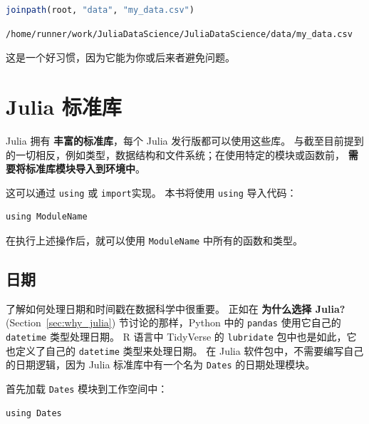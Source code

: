 \documentclass[
  notoc %
]{tufte-book}
\newcommand{\passthrough}[1]{#1}
\begin{document}
\begin{lstlisting}[language=Julia]
joinpath(root, "data", "my_data.csv")
\end{lstlisting}

\begin{lstlisting}[language=Output]
/home/runner/work/JuliaDataScience/JuliaDataScience/data/my_data.csv
\end{lstlisting}

这是一个好习惯，因为它能为你或后来者避免问题。

\hypertarget{sec:standardlibrary}{%
\section{Julia 标准库}\label{sec:standardlibrary}}

Julia 拥有 \textbf{丰富的标准库}，每个 Julia 发行版都可以使用这些库。
与截至目前提到的一切相反，例如类型，数据结构和文件系统；在使用特定的模块或函数前，
\textbf{需要将标准库模块导入到环境中}。

这可以通过 \passthrough{\lstinline!using!} 或
\passthrough{\lstinline!import!}实现。 本书将使用
\passthrough{\lstinline!using!} 导入代码：

\begin{lstlisting}
using ModuleName
\end{lstlisting}

在执行上述操作后，就可以使用 \passthrough{\lstinline!ModuleName!}
中所有的函数和类型。

\hypertarget{sec:dates}{%
\subsection{日期}\label{sec:dates}}

了解如何处理日期和时间戳在数据科学中很重要。 正如在 \textbf{为什么选择
Julia?} (Section~\ref{sec:why_julia}) 节讨论的那样，Python 中的
\passthrough{\lstinline!pandas!} 使用它自己的
\passthrough{\lstinline!datetime!} 类型处理日期。 R 语言中 TidyVerse 的
\passthrough{\lstinline!lubridate!} 包中也是如此，它也定义了自己的
\passthrough{\lstinline!datetime!} 类型来处理日期。 在 Julia
软件包中，不需要编写自己的日期逻辑，因为 Julia 标准库中有一个名为
\passthrough{\lstinline!Dates!} 的日期处理模块。

首先加载 \passthrough{\lstinline!Dates!} 模块到工作空间中：

\begin{lstlisting}
using Dates
\end{lstlisting}
\end{document}
